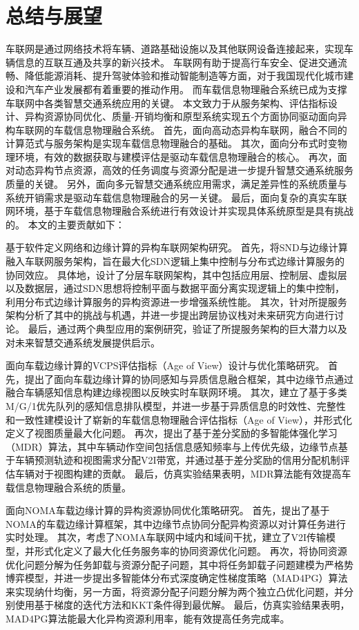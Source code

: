 \chapter{总结与展望}\label{section 7}

车联网是通过网络技术将车辆、道路基础设施以及其他联网设备连接起来，实现车辆信息的互联互通及共享的新兴技术。
车联网有助于提高行车安全、促进交通流畅、降低能源消耗、提升驾驶体验和推动智能制造等方面，对于我国现代化城市建设和汽车产业发展都有着重要的推动作用。
而车载信息物理融合系统已成为支撑车联网中各类智慧交通系统应用的关键。
本文致力于从服务架构、评估指标设计、异构资源协同优化、质量-开销均衡和原型系统实现五个方面协同驱动面向异构车联网的车载信息物理融合系统。
首先，面向高动态异构车联网，融合不同的计算范式与服务架构是实现车载信息物理融合的基础。
其次，面向分布式时变物理环境，有效的数据获取与建模评估是驱动车载信息物理融合的核心。
再次，面对动态异构节点资源，高效的任务调度与资源分配是进一步提升智慧交通系统服务质量的关键。
另外，面向多元智慧交通系统应用需求，满足差异性的系统质量与系统开销需求是驱动车载信息物理融合的另一关键。
最后，面向复杂的真实车联网环境，基于车载信息物理融合系统进行有效设计并实现具体系统原型是具有挑战的。
本文的主要贡献如下：

 基于软件定义网络和边缘计算的异构车联网架构研究。
首先，将SND与边缘计算融入车联网服务架构，旨在最大化SDN逻辑上集中控制与分布式边缘计算服务的协同效应。
具体地，设计了分层车联网架构，其中包括应用层、控制层、虚拟层以及数据层，通过SDN思想将控制平面与数据平面分离实现逻辑上的集中控制，利用分布式边缘计算服务的异构资源进一步增强系统性能。
其次，针对所提服务架构分析了其中的挑战与机遇，并进一步提出跨层协议栈对未来研究方向进行讨论。
最后，通过两个典型应用的案例研究，验证了所提服务架构的巨大潜力以及对未来智慧交通系统发展提供启示。

 面向车载边缘计算的VCPS评估指标（Age of View）设计与优化策略研究。
首先，提出了面向车载边缘计算的协同感知与异质信息融合框架，其中边缘节点通过融合车辆感知信息构建边缘视图以反映实时车联网环境。
其次，建立了基于多类M/G/1优先队列的感知信息排队模型，并进一步基于异质信息的时效性、完整性和一致性建模设计了崭新的车载信息物理融合评估指标（Age of View），并形式化定义了视图质量最大化问题。
再次，提出了基于差分奖励的多智能体强化学习（MDR）算法，其中车辆动作空间包括信息感知频率与上传优先级，边缘节点基于车辆预测轨迹和视图需求分配V2I带宽，并通过基于差分奖励的信用分配机制评估车辆对于视图构建的贡献。
最后，仿真实验结果表明，MDR算法能有效提高车载信息物理融合系统的质量。

 面向NOMA车载边缘计算的异构资源协同优化策略研究。
首先，提出了基于NOMA的车载边缘计算框架，其中边缘节点协同分配异构资源以对计算任务进行实时处理。
其次，考虑了NOMA车联网中域内和域间干扰，建立了V2I传输模型，并形式化定义了最大化任务服务率的协同资源优化问题。
再次，将协同资源优化问题分解为任务卸载与资源分配子问题，其中将任务卸载子问题建模为严格势博弈模型，并进一步提出多智能体分布式深度确定性梯度策略（MAD4PG）算法来实现纳什均衡，另一方面，将资源分配子问题分解为两个独立凸优化问题，并分别使用基于梯度的迭代方法和KKT条件得到最优解。
最后，仿真实验结果表明，MAD4PG算法能最大化异构资源利用率，能有效提高任务完成率。

